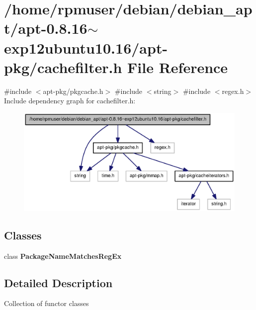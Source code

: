 \section{/home/rpmuser/debian/debian\-\_\-apt/apt-\/0.8.16$\sim$exp12ubuntu10.16/apt-\/pkg/cachefilter.h \-File \-Reference}
\label{cachefilter_8h}
{\ttfamily \#include $<$apt-\/pkg/pkgcache.\-h$>$}\*
{\ttfamily \#include $<$string$>$}\*
{\ttfamily \#include $<$regex.\-h$>$}\*
\-Include dependency graph for cachefilter.\-h\-:
\nopagebreak
\begin{figure}[H]
\begin{center}
\leavevmode
\includegraphics[width=350pt]{cachefilter_8h__incl}
\end{center}
\end{figure}
\subsection*{\-Classes}
\begin{DoxyCompactItemize}
\item 
class {\bf \-Package\-Name\-Matches\-Reg\-Ex}
\end{DoxyCompactItemize}


\subsection{\-Detailed \-Description}
\-Collection of functor classes 